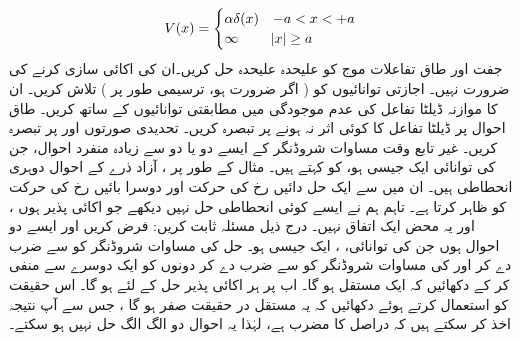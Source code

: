 \begin{align*}
V(x)=
\begin{cases}
\alpha\delta (x)& -a< x< +a\\
\infty &\abs{x}\ge a
\end{cases}
 \end{align*} 
 جفت اور طاق تفاعلات  موج کو علیحدہ علیحدہ حل کریں۔ان کی اکائی سازی کرنے کی ضرورت نہیں۔ اجازتی توانائیوں کو  ( اگر ضرورت ہو،  ترسیمی طور پر ) تلاش کریں۔ ان کا موازنہ ڈیلٹا تفاعل کی عدم  موجودگی میں مطابقتی توانائیوں کے ساتھ کریں۔ طاق احوال پر ڈیلٹا تفاعل کا کوئی اثر نہ ہونے پر تبصرہ کریں۔ تحدیدی صورتوں  اور پر تبصرہ کریں۔ 
غیر تابع وقت مساوات شروڈنگر کے  ایسے دو یا دو سے زیادہ   منفرد  احوال،  جن کی توانائی  ایک جیسی ہو،  کو  کہتے ہیں۔ مثال کے طور پر ، آزاد ذرے کے احوال  دوہری انحطاطی ہیں۔ ان میں سے ایک حل دائیں رخ کی حرکت  اور دوسرا بائیں رخ  کی حرکت کو ظاہر کرتا ہے۔ تاہم ہم نے ایسے کوئی انحطاطی حل نہیں دیکھے جو اکائی پذیر ہوں ، اور یہ محض ایک اتفاق نہیں۔   درج ذیل مسئلہ ثابت کریں:      فرض کریں  اور  ایسے دو احوال  ہوں جن کی توانائی، ، ایک جیسی ہو۔ حل   کی مساوات شروڈنگر کو   سے ضرب دے کر  اور  کی مساوات شروڈنگر کو  سے ضرب دے کر  دونوں کو ایک دوسرے سے  منفی کر کے دکھائیں کہ  ایک مستقل ہو گا۔ اب  پر ہر اکائی پذیر حل کے لئے   ہو گا۔ اس حقیقت کو استعمال کرتے ہوئے دکھائیں کہ یہ مستقل در حقیقت صفر ہو گا ، جس سے آپ نتیجہ اخذ کر سکتے ہیں کہ  دراصل  کا مضرب ہے،  لہٰذا یہ احوال دو الگ الگ حل نہیں ہو سکتے۔
